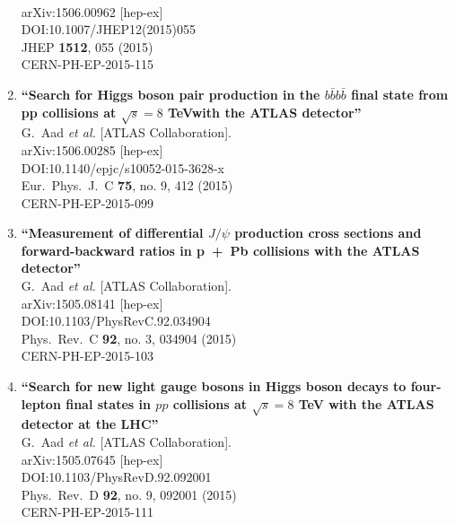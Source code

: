 \documentclass{article}
\begin{document}
\begin{enumerate}
  \\{}arXiv:1506.00962 [hep-ex]
  \\{}DOI:10.1007/JHEP12(2015)055
  \\{}JHEP {\bf 1512}, 055 (2015)
  \\{}CERN-PH-EP-2015-115
\item%
{\bf ``Search for Higgs boson pair production in the $b\bar{b}b\bar{b}$ final state from pp collisions at $\sqrt{s} = 8$ TeVwith the ATLAS detector''}
  \\{}G.~Aad {\it et al.} [ATLAS Collaboration].
  \\{}arXiv:1506.00285 [hep-ex]
  \\{}DOI:10.1140/epjc/s10052-015-3628-x
  \\{}Eur.\ Phys.\ J.\ C {\bf 75}, no. 9, 412 (2015)
  \\{}CERN-PH-EP-2015-099
\item%
{\bf ``Measurement of differential $J/\psi$ production cross sections and forward-backward ratios in p + Pb collisions with the ATLAS detector''}
  \\{}G.~Aad {\it et al.} [ATLAS Collaboration].
  \\{}arXiv:1505.08141 [hep-ex]
  \\{}DOI:10.1103/PhysRevC.92.034904
  \\{}Phys.\ Rev.\ C {\bf 92}, no. 3, 034904 (2015)
  \\{}CERN-PH-EP-2015-103
\item%
{\bf ``Search for new light gauge bosons in Higgs boson decays to four-lepton final states in $pp$ collisions at $\sqrt{s}=8$ TeV with the ATLAS detector at the LHC''}
  \\{}G.~Aad {\it et al.} [ATLAS Collaboration].
  \\{}arXiv:1505.07645 [hep-ex]
  \\{}DOI:10.1103/PhysRevD.92.092001
  \\{}Phys.\ Rev.\ D {\bf 92}, no. 9, 092001 (2015)
  \\{}CERN-PH-EP-2015-111

\end{enumerate}
\end{document}
